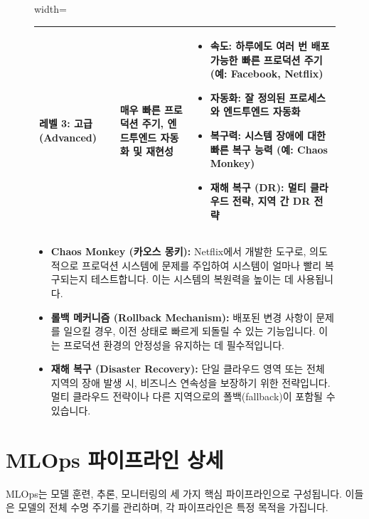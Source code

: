 \documentclass[11pt,a4paper]{article}
\begin{document}
\begin{figure}[h!]
\begin{adjustbox}{width=\textwidth}
\begin{tabular}{p{} | p{} | p{}}
    \midrule
    \textbf{레벨 3: 고급 (Advanced)} & 매우 빠른 프로덕션 주기, 엔드투엔드 자동화 및 재현성 &
    \begin{itemize}
        \item \textbf{속도:} 하루에도 여러 번 배포 가능한 빠른 프로덕션 주기 (예: Facebook, Netflix)
        \item \textbf{자동화:} 잘 정의된 프로세스와 엔드투엔드 자동화
        \item \textbf{복구력:} 시스템 장애에 대한 빠른 복구 능력 (예: Chaos Monkey)
        \item \textbf{재해 복구 (DR):} 멀티 클라우드 전략, 지역 간 DR 전략
    \end{itemize} \\
    \bottomrule
    \end{tabular}
    \end{adjustbox}
    \vspace{1em}
    \begin{itemize}
        \item \textbf{Chaos Monkey (카오스 몽키):} Netflix에서 개발한 도구로, 의도적으로 프로덕션 시스템에 문제를 주입하여 시스템이 얼마나 빨리 복구되는지 테스트합니다. 이는 시스템의 복원력을 높이는 데 사용됩니다.
        \item \textbf{롤백 메커니즘 (Rollback Mechanism):} 배포된 변경 사항이 문제를 일으킬 경우, 이전 상태로 빠르게 되돌릴 수 있는 기능입니다. 이는 프로덕션 환경의 안정성을 유지하는 데 필수적입니다.
        \item \textbf{재해 복구 (Disaster Recovery):} 단일 클라우드 영역 또는 전체 지역의 장애 발생 시, 비즈니스 연속성을 보장하기 위한 전략입니다. 멀티 클라우드 전략이나 다른 지역으로의 폴백(fallback)이 포함될 수 있습니다.
    \end{itemize}
\end{figure}

\newpage
\section{MLOps 파이프라인 상세}

MLOps는 모델 훈련, 추론, 모니터링의 세 가지 핵심 파이프라인으로 구성됩니다. 이들은 모델의 전체 수명 주기를 관리하며, 각 파이프라인은 특정 목적을 가집니다.
\end{document}
